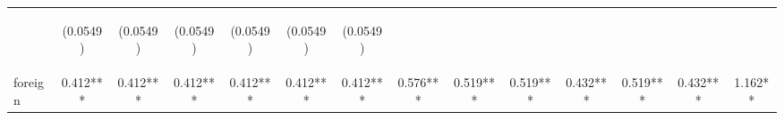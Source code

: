 \begin{center}
\begin{tabular}{lccccccccccccc}
\vspace{4pt} & \begin{footnotesize}(0.0549)\end{footnotesize} & \begin{footnotesize}(0.0549)\end{footnotesize} & \begin{footnotesize}(0.0549)\end{footnotesize} & \begin{footnotesize}(0.0549)\end{footnotesize} & \begin{footnotesize}(0.0549)\end{footnotesize} & \begin{footnotesize}(0.0549)\end{footnotesize} & \begin{footnotesize}\end{footnotesize} & \begin{footnotesize}\end{footnotesize} & \begin{footnotesize}\end{footnotesize} & \begin{footnotesize}\end{footnotesize} & \begin{footnotesize}\end{footnotesize} & \begin{footnotesize}\end{footnotesize} & \begin{footnotesize}\end{footnotesize} \\
foreign & 0.412*** & 0.412*** & 0.412*** & 0.412*** & 0.412*** & 0.412*** & 0.576*** & 0.519*** & 0.519*** & 0.432*** & 0.519*** & 0.432*** & 1.162** \\

\end{tabular}
\end{center}
